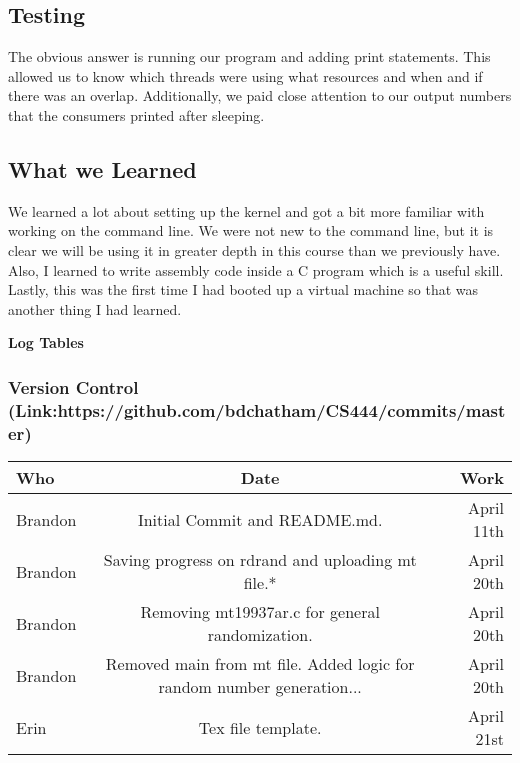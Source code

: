 \documentclass[10pt,draftclsnofoot,onecolumn]{IEEEtran}
\begin{document}
{\subsection{Testing}
The obvious answer is running our program and adding print statements. This allowed us to know which threads were using what resources and when and if there was an overlap. Additionally, we paid close attention to our output numbers that the consumers printed after sleeping. 
\subsection{What we Learned}
We learned a lot about setting up the kernel and got a bit more familiar with working on the command line. We were not new to the command line, but it is clear we will be using it in greater depth in this course than we previously have. Also, I learned to write assembly code inside a C program which is a useful skill. Lastly, this was the first time I had booted up a virtual machine so that was another thing I had learned. 
\vspace{5mm}



{\Large\textbf{Log Tables}}\\
\vspace{5mm}
\subsubsection{Version Control (Link:https://github.com/bdchatham/CS444/commits/master)}
\begin{center}
	\begin{tabular}{ | l | c | r|}
		\hline
		Who & Date & Work\\
		\hline
		Brandon & Initial Commit and README.md. & April 11th\\
		\hline
		Brandon & Saving progress on rdrand and uploading mt file.* & April 20th\\
		\hline
		Brandon & Removing mt19937ar.c for general randomization. & April 20th\\
		\hline
		Brandon & Removed main from mt file. Added logic for random number generation... & April 20th\\
		\hline
		Erin & Tex file template. & April 21st\\
		\hline
	\end{tabular}
\end{center}
}
\end{document}
